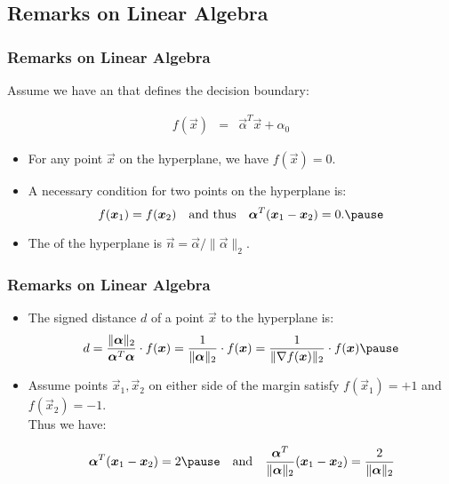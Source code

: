 \subsection{Remarks on Linear Algebra}

\begin{frame}
  \frametitle{Remarks on Linear Algebra}

  Assume we have an  that defines the decision boundary: \pause

  \begin{eqnarray*}
    f(\vec x) &=& \vec \alpha^T \vec x + \alpha_0
  \end{eqnarray*}
  \pause
  
  \begin{itemize}
    \item For any point $\vec x$ on the hyperplane, we have $f(\vec x)= 0$. \\[.5cm] \pause
    \item A necessary condition for two points on the hyperplane is:
      \begin{displaymath}
        f(\vec x_1) = f(\vec x_2) \quad \mbox{and thus} \quad \vec \alpha^T (\vec x_1-\vec x_2) =0.
        \pause
      \end{displaymath}
    \item The  of the hyperplane is $\vec n= \vec \alpha/\|\vec \alpha\|_2$.
  \end{itemize}
\end{frame}


\begin{frame}
  \frametitle{Remarks on Linear Algebra \cont}
 
  \begin{itemize}
    \item The signed distance $d$ of a point $\vec x$ to the hyperplane is: \pause
      \begin{displaymath}
        d = 
        \frac{\|\vec \alpha\|_2}{\vec \alpha^T\vec \alpha} \cdot f(\vec x) = 
        \frac{1}{\|\vec \alpha\|_2}\cdot f(\vec x)  =
        \frac{1}{\|\nabla f(\vec x)\|_2}\cdot f(\vec x) \pause
      \end{displaymath}
    \item Assume points $\vec x_1, \vec x_2$ on either side of the margin satisfy $f(\vec x_1)= +1$ and $f(\vec x_2)=-1$. \\[.5cm]
            
      Thus we have:

      \begin{displaymath}
        \vec \alpha^T (\vec x_1 - \vec x_2) = 2 \pause
        \quad \mbox{and} \quad
        \frac{\vec \alpha^T}{\|\vec \alpha\|_2} (\vec x_1-\vec x_2) 
        = \frac{2}{\|\vec \alpha\|_2}
      \end{displaymath}
  \end{itemize}
\end{frame}


